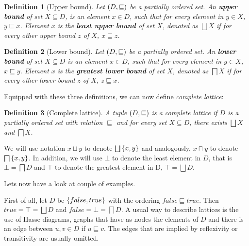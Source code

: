 \documentclass[..thesis.tex]{subfiles}
\newtheorem{defin}{Definition}[section]
\begin{document}
\begin{defin}[Upper bound]
Let $\left( D, \sqsubseteq \right)$ be a partially ordered set. An \textbf{upper bound} of set $X \subseteq D$,  is an element $x \in D$, such that for every element in $y \in X$, $y \sqsubseteq x$. Element $x$ is the \textbf{least upper bound} of set $X$, denoted as $\bigsqcup X$ if for every other upper bound $z$ of $X$, $x \sqsubseteq z$.  
\end{defin}

\begin{defin}[Lower bound]
Let $\left( D, \sqsubseteq \right)$ be a partially ordered set. An \textbf{lower bound} of set $X \subseteq D$  is an element $x \in D$, such that for every element in $y \in X$, $x \sqsubseteq y$. Element $x$ is the \textbf{greatest lower bound} of set $X$, denoted as $\bigsqcap X$ if for every other lower bound $z$ of $X$, $z \sqsubseteq x$.    
\end{defin}

Equipped with these three definitions, we can now define \textit{complete lattice}:

\begin{defin}[Complete lattice]
A tuple $\left( D, \sqsubseteq \right)$ is a complete lattice if $D$ is a partially ordered set with relation $\sqsubseteq$ and for every set $X \subseteq D$, there exists $\bigsqcup X$ and $\bigsqcap X$.
\end{defin}


We will use notation $x \sqcup  y$ to denote $\bigsqcup \left\lbrace x, y \right\rbrace$ and analogously, $x \sqcap y $ to denote $\bigsqcap \lb x, y \rb$. In addition, we will use $\bot$ to denote the least element in $D$, that is $\bot = \bigsqcap D$ and $\top$ to denote the greatest element in D, $\top = \bigsqcup D$.


Lets now have a look at couple of examples. 

First of all, let $D$ be $\left\lbrace false, true \right\rbrace$ with the ordering $false \sqsubseteq true$. Then $true = \top = \bigsqcup D$ and $false = \bot = \bigsqcap D$. A usual way to describe lattices is the use of Hasse diagrams, graphs that have as nodes the elements of $D$ and there is an edge between $u, v \in D$ if $u \sqsubseteq v$. The edges that are implied by reflexivity or transitivity are usually omitted.
\end{document}

